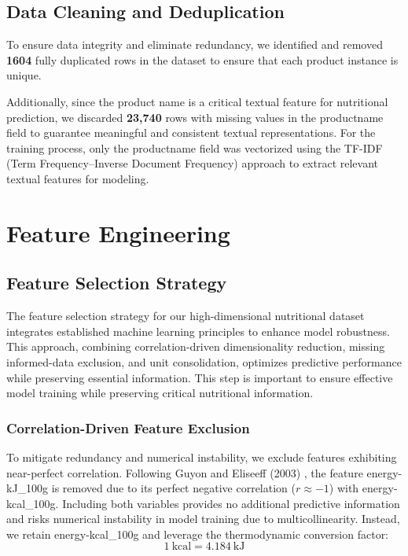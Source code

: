 \subsection{Data Cleaning and Deduplication}
To ensure data integrity and eliminate redundancy, we identified and removed \textbf{1604} fully duplicated rows in the dataset to ensure that each product instance is unique.
\par Additionally, since the product name is a critical textual feature for nutritional prediction, we discarded \textbf{23,740} rows with missing values in the product\textunderscore name field to guarantee meaningful and consistent textual representations. For the training process, only the product\textunderscore name field was vectorized using the TF-IDF (Term Frequency–Inverse Document Frequency) approach to extract relevant textual features for modeling.

\section{Feature Engineering}

\subsection{Feature Selection Strategy}
The feature selection strategy for our high-dimensional nutritional dataset integrates established machine learning principles to enhance model robustness. This approach, combining correlation-driven dimensionality reduction, missing  informed-data exclusion, and unit consolidation, optimizes predictive performance while preserving essential information. This step is important to ensure effective model training while preserving critical nutritional information.

\subsubsection{Correlation-Driven Feature Exclusion}
To mitigate redundancy and numerical instability, we exclude features exhibiting near-perfect correlation. Following Guyon and Eliseeff (2003) \cite{guyon2003}, the feature energy-kJ\_100g is removed due to its perfect negative correlation ($r \approx -1$) with energy-kcal\_100g. Including both variables provides no additional predictive information and risks numerical instability in model training due to multicollinearity. Instead, we retain energy-kcal\_100g and leverage the thermodynamic conversion factor:
$$1~\mathrm{kcal} = 4.184~\mathrm{kJ}$$

